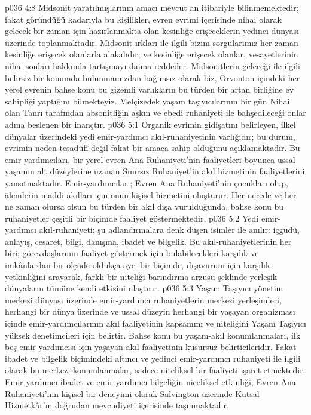 \vs p036 4:8 Midsonit yaratılmışlarının amacı mevcut an itibariyle bilinmemektedir; fakat göründüğü kadarıyla bu kişilikler, evren evrimi içerisinde nihai olarak gelecek bir zaman için hazırlanmakta olan kesinliğe erişeceklerin yedinci dünyası üzerinde toplanmaktadır. Midsonit ırkları ile ilgili bizim sorgularımız her zaman kesinliğe erişecek olanlarla alakalıdır; ve kesinliğe erişecek olanlar, vesayetlerinin nihai sonları hakkında tartışmayı daima reddeder. Midsonitlerin geleceği ile ilgili belirsiz bir konumda bulunmamızdan bağımsız olarak biz, Orvonton içindeki her yerel evrenin bahse konu bu gizemli varlıkların bu türden bir artan birliğine ev sahipliği yaptığını bilmekteyiz. Melçizedek yaşam taşıyıcılarının bir gün Nihai olan Tanrı tarafından absonitliğin aşkın ve ebedi ruhaniyeti ile bahşedileceği onlar adına beslenen bir inançtır.
\vs p036 5:1 Organik evrimin gidişatını belirleyen, ilkel dünyalar üzerindeki yedi emir\hyp{}yardımcı akıl\hyp{}ruhaniyetinin varlığıdır; bu durum, evrimin neden tesadüfî değil fakat bir amaca sahip olduğunu açıklamaktadır. Bu emir\hyp{}yardımcıları, bir yerel evren Ana Ruhaniyeti’nin faaliyetleri boyunca ussal yaşamın alt düzeylerine uzanan Sınırsız Ruhaniyet’in akıl hizmetinin faaliyetlerini yansıtmaktadır. Emir\hyp{}yardımcıları; Evren Ana Ruhaniyeti’nin çocukları olup, âlemlerin maddi akılları için onun kişisel hizmetini oluşturur. Her nerede ve her ne zaman olursa olsun bu türden bir akıl dışa vurulduğunda, bahse konu bu ruhaniyetler çeşitli bir biçimde faaliyet göstermektedir.
\vs p036 5:2 Yedi emir\hyp{}yardımcı akıl\hyp{}ruhaniyeti; şu adlandırmalara denk düşen isimler ile anılır: içgüdü, anlayış, cesaret, bilgi, danışma, ibadet ve bilgelik. Bu akıl\hyp{}ruhaniyetlerinin her biri; görevdaşlarının faaliyet göstermek için bulabilecekleri karşılık ve imkânlardan bir ölçüde oldukça ayrı bir biçimde, dışavurum için karşılık yetkinliğini arayarak, farklı bir niteliği barındırma arzusu şeklinde yerleşik dünyaların tümüne kendi etkisini ulaştırır.
\vs p036 5:3 Yaşam Taşıyıcı yönetim merkezi dünyası üzerinde emir\hyp{}yardımcı ruhaniyetlerin merkezi yerleşimleri, herhangi bir dünya üzerinde ve ussal düzeyin herhangi bir yaşayan organizması içinde emir\hyp{}yardımcılarının akıl faaliyetinin kapsamını ve niteliğini Yaşam Taşıyıcı yüksek denetimcileri için belirtir. Bahse konu bu yaşam\hyp{}akıl konumlanmaları, ilk beş emir\hyp{}yardımcısı için yaşayan akıl faaliyetinin kusursuz belirticileridir. Fakat ibadet ve bilgelik biçimindeki altıncı ve yedinci emir\hyp{}yardımcı ruhaniyeti ile ilgili olarak bu merkezi konumlanmalar, sadece niteliksel bir faaliyeti işaret etmektedir. Emir\hyp{}yardımcı ibadet ve emir\hyp{}yardımcı bilgeliğin niceliksel etkinliği, Evren Ana Ruhaniyeti’nin kişisel bir deneyimi olarak Salvington üzerinde Kutsal Hizmetkâr’ın doğrudan mevcudiyeti içerisinde taşınmaktadır.
